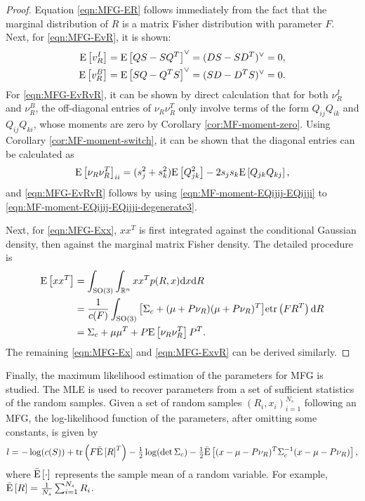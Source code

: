 \begin{proof}
	Equation \eqref{eqn:MFG-ER} follows immediately from the fact that the marginal distribution of $R$ is a matrix Fisher distribution with parameter $F$.
	Next, for \eqref{eqn:MFG-EvR}, it is shown:
	\begin{align*}
		\mathrm{E}\left[ v_R^I \right] &= \mathrm{E}\left[ QS-SQ^T \right]^\vee = (DS-SD^T)^\vee = 0, \\
		\mathrm{E}\left[ v_R^B \right] &= \mathrm{E}\left[ SQ-Q^TS \right]^\vee = (SD-D^TS)^\vee = 0.
	\end{align*}
	For \eqref{eqn:MFG-EvRvR}, it can be shown by direct calculation that for both $\nu_R^I$ and $\nu_R^B$, the off-diagonal entries of $\nu_R\nu_R^T$ only involve terms of the form $Q_{ij}Q_{ik}$ and $Q_{ij}Q_{ki}$, whose moments are zero by Corollary \ref{cor:MF-moment-zero}.
	Using Corollary \ref{cor:MF-moment-switch}, it can be shown that the diagonal entries can be calculated as
	\begin{align*}
		\mathrm{E}\left[ \nu_R\nu_R^T \right]_{ii} = (s_j^2+s_k^2)\mathrm{E}\left[ Q_{jk}^2 \right] - 2s_js_k\mathrm{E}\left[ Q_{jk}Q_{kj} \right],
	\end{align*}
	and \eqref{eqn:MFG-EvRvR} follows by using \eqref{eqn:MF-moment-EQijij-EQijji} to \eqref{eqn:MF-moment-EQijij-EQijji-degenerate3}.
	
	Next, for \eqref{eqn:MFG-Exx}, $xx^T$ is first integrated against the conditional Gaussian density, then against the marginal matrix Fisher density.
	The detailed procedure is
	\begin{align} \label{eqn:MFG-Exx-proof}
		\mathrm{E}\left[ xx^T \right] &= \int_{\mathrm{SO}(3)} \int_{\mathbb{R}^n} xx^T p(R,x) \mathrm{d} x \mathrm{d} R \nonumber \\
		&= \frac{1}{c(F)} \int_{\mathrm{SO}(3)} \big[ \Sigma_c+(\mu+P\nu_R)(\mu+P\nu_R)^T \big] \mathrm{etr}\left( FR^T \right) \mathrm{d} R \nonumber \\
		&= \Sigma_c + \mu\mu^T + P\mathrm{E}\left[ \nu_R\nu_R^T \right]P^T.
	\end{align}
	The remaining \eqref{eqn:MFG-Ex} and \eqref{eqn:MFG-ExvR} can be derived similarly.
\end{proof}

Finally, the maximum likelihood estimation of the parameters for MFG is studied.
The MLE is used to recover parameters from a set of sufficient statistics of the random samples.
Given a set of random samples $(R_i,x_i)_{i=1}^{N_s}$ following an MFG, the log-likelihood function of the parameters, after omitting some constants, is given by
\begin{align} \label{eqn:MFG-loglikelihood}
	l = -\log(c(S)) + \mathrm{tr}\left( F\bar{\mathrm{E}}\left[ R \right]^T \right) - \tfrac{1}{2}\log(\det\Sigma_c) - \tfrac{1}{2}\bar{\mathrm{E}}\left[ (x-\mu-P\nu_R)^T\Sigma_c^{-1}(x-\mu-P\nu_R) \right],
\end{align}
where $\bar{\mathrm{E}}\left[ \cdot \right]$ represents the sample mean of a random variable.
For example, $\bar{\mathrm{E}}\left[ R \right] = \frac{1}{N_s}\sum_{i=1}^{N_s} R_i$.

